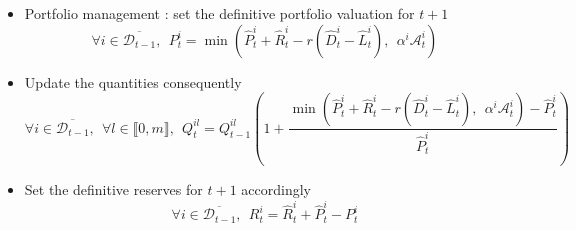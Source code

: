 \documentclass{article}
\newcommand{\wh}{\widehat}
\begin{document}
\begin{itemize}

\item Portfolio management : set the definitive portfolio valuation for $t+1$
$$\forall i \in \overline{\mathcal{D}_{t-1}},~~P_t^{i} = \min(\widehat{P}_t^i + \widehat{R}_t^i - r( \wh D_t^i - \wh L_t^i),~~\alpha^i \mathcal{A}_t^i)$$

\item Update the quantities consequently
$$\forall i \in \overline{\mathcal{D}_{t-1}},~~\forall l \in \llbracket 0, m \rrbracket,~~Q_t^{il} = Q_{t-1}^{il}\left(1 + \frac{\min(\widehat{P}_t^i + \widehat{R}_t^i - r( \wh D_t^i - \wh L_t^i),~~\alpha^i \mathcal{A}_t^i) - \widehat{P}_t^i}{\widehat{P}_t^i} \right)$$

\item Set the definitive reserves for $t+1$ accordingly
$$\forall i \in \overline{\mathcal{D}_{t-1}},~~R_t^i = \widehat{R}_t^i + \widehat{P}_t^i - P_t^i$$
\end{itemize}
\end{document}
